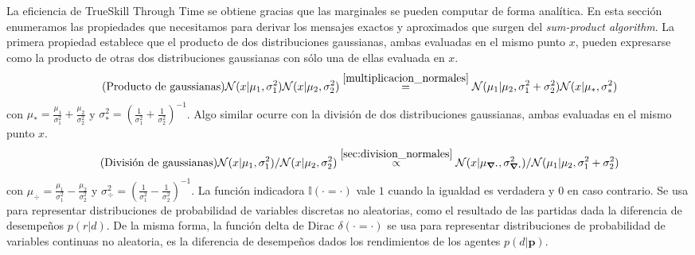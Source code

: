\documentclass[a4paper,11pt]{book}
\newcommand{\N}{\mathcal{N}}
\theoremstyle{definition}
\newif\ifen
\newcommand{\en}[1]{\ifen#1\fi}
\begin{document}
La eficiencia de TrueSkill Through Time se obtiene gracias que las marginales se pueden computar de forma anal\'itica.
%
En esta secci\'on enumeramos las propiedades que necesitamos para derivar los mensajes exactos y aproximados que surgen del \emph{sum-product algorithm}.
%
La primera propiedad establece que el producto de dos distribuciones gaussianas, ambas evaluadas en el mismo punto $x$, pueden expresarse como la producto de otras dos distribuciones gaussianas con s\'olo una de ellas evaluada en $x$.
%
\begin{equation*}\label{eq:gaussian_product} \tag{\text{Producto de gaussianas}}
\N(x|\mu_1,\sigma_1^2)\N(x|\mu_2,\sigma_2^2) \overset{\ref{multiplicacion_normales}}{=} \N(\mu_1|\mu_2,\sigma_1^2+\sigma_2^2) \N(x|\mu_{*},\sigma_{*}^2)
\end{equation*}
%
con $\mu_{*} = \frac{\mu_1}{\sigma_1^2} + \frac{\mu_2}{\sigma_2^2}$ y $\sigma_{*}^2 = \left(\frac{1}{\sigma_1^2} + \frac{1}{\sigma_2^2} \right)^{-1}$.
%
Algo similar ocurre con la divisi\'on de dos distribuciones gaussianas, ambas evaluadas en el mismo punto $x$.
\begin{equation*}\label{eq:gaussian_division} \tag{\text{Divisi\'on de gaussianas}}
\N(x|\mu_1,\sigma_1^2)/\N(x|\mu_2,\sigma_2^2) \overset{\ref{sec:division_normales}}{\propto} \N(x|\mu_{\div},\sigma_{\div}^2)/\N(\mu_1|\mu_2,\sigma_1^2+\sigma_2^2)
\end{equation*}
%
con $\mu_{\div} = \frac{\mu_1}{\sigma_1^2} - \frac{\mu_2}{\sigma_2^2}$ y $\sigma_{\div}^2 = \left(\frac{1}{\sigma_1^2} - \frac{1}{\sigma_2^2} \right)^{-1}$.
La funci\'on indicadora $\mathbb{I}(\cdot=\cdot)$ vale $1$ cuando la igualdad es verdadera y $0$ en caso contrario.
%
%
Se usa para representar distribuciones de probabilidad de variables discretas no aleatorias, como el resultado de las partidas dada la diferencia de desempe\~nos $p(r|d)$.
%
De la misma forma, la funci\'on delta de Dirac $\delta(\cdot=\cdot)$ se usa para representar distribuciones de probabilidad de variables continuas no aleatoria, es la diferencia de desempe\~nos dados los rendimientos de los agentes $p(d|\bm{p})$.
\end{document}
